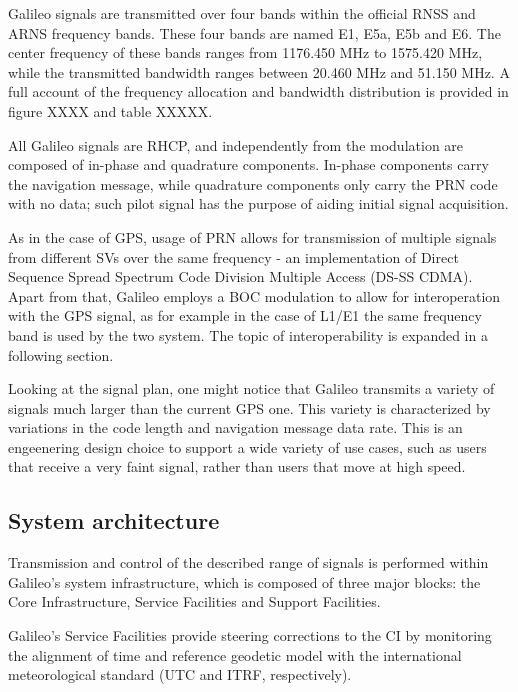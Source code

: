 \par

Galileo signals are transmitted over four bands within the official RNSS and
ARNS frequency bands. These four bands are named E1, E5a, E5b and E6. The center
frequency of these bands ranges from 1176.450 MHz to 1575.420 MHz, while the
transmitted bandwidth ranges between 20.460 MHz and 51.150 MHz. A full account
of the frequency allocation and bandwidth distribution is provided in figure XXXX
and table XXXXX.


All Galileo signals are RHCP, and independently from the modulation are composed
of in-phase and quadrature components. In-phase components carry the navigation
message, while quadrature components only carry the PRN code with no data; such
pilot signal has the purpose of aiding initial signal acquisition.

As in the case of GPS, usage of PRN allows for transmission of multiple signals
from different SVs over the same frequency - an implementation of Direct
Sequence Spread Spectrum Code Division Multiple Access (DS-SS CDMA). Apart from
that, Galileo employs a BOC modulation to allow for interoperation with the GPS
signal, as for example in the case of L1/E1 the same frequency band is used by
the two system. The topic of interoperability is expanded in a following
section.

Looking at the signal plan, one might notice that Galileo transmits a variety of
signals much larger than the current GPS one. This variety is characterized by
variations in the code length and navigation message data rate. This is an
engeenering design choice to support a wide variety of use cases, such as users
that receive a very faint signal, rather than users that move at high speed.

\subsection{System architecture}
Transmission and control of the described range of signals is performed within
Galileo's system infrastructure, which is composed of three major blocks: the
Core Infrastructure, Service Facilities and Support Facilities.

Galileo's Service Facilities provide steering corrections to the CI by
monitoring the alignment of time and reference geodetic model with the
international meteorological standard (UTC and ITRF, respectively).


